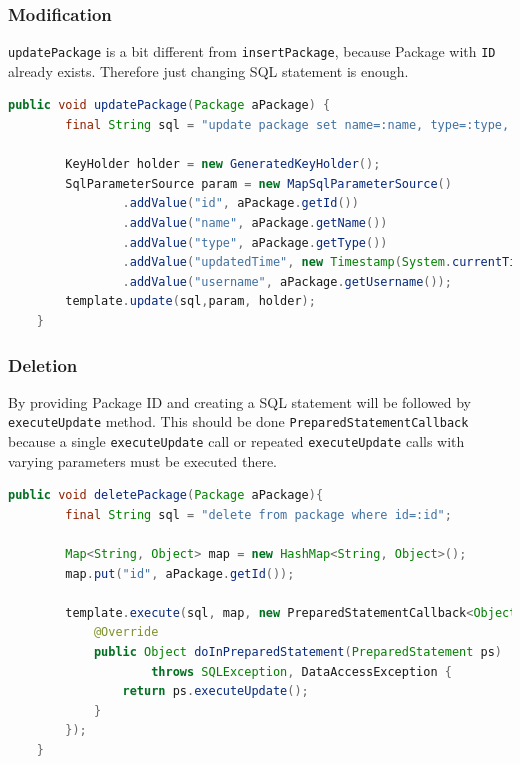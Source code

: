 \subsubsection{Modification}
\texttt{updatePackage} is a bit different from \texttt{insertPackage}, because Package with \texttt{ID} already exists. Therefore just changing SQL statement is enough.

\begin{lstlisting}[language={Java}]
public void updatePackage(Package aPackage) {
        final String sql = "update package set name=:name, type=:type, updatedTime=:updatedTime, username=:username where id=:id";

        KeyHolder holder = new GeneratedKeyHolder();
        SqlParameterSource param = new MapSqlParameterSource()
                .addValue("id", aPackage.getId())
                .addValue("name", aPackage.getName())
                .addValue("type", aPackage.getType())
                .addValue("updatedTime", new Timestamp(System.currentTimeMillis()))
                .addValue("username", aPackage.getUsername());
        template.update(sql,param, holder);
    }
\end{lstlisting}

\subsubsection{Deletion}
By providing Package ID and creating a SQL statement will be followed by \texttt{executeUpdate} method. This should be done \texttt{PreparedStatementCallback} because a single \texttt{executeUpdate} call or repeated \texttt{executeUpdate} calls with varying parameters must be executed there.

\begin{lstlisting}[language={Java}]
public void deletePackage(Package aPackage){
        final String sql = "delete from package where id=:id";

        Map<String, Object> map = new HashMap<String, Object>();
        map.put("id", aPackage.getId());

        template.execute(sql, map, new PreparedStatementCallback<Object>() {
            @Override
            public Object doInPreparedStatement(PreparedStatement ps)
                    throws SQLException, DataAccessException {
                return ps.executeUpdate();
            }
        });
    }
\end{lstlisting}

